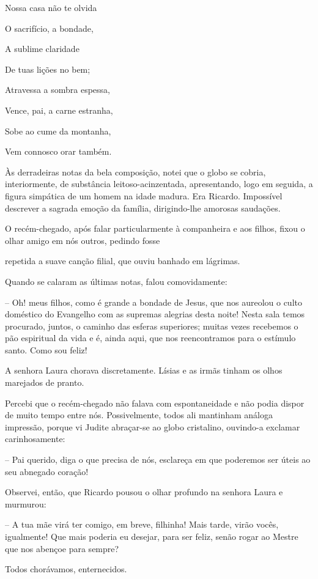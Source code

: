 \documentclass[portuguese,12pt,a4paper]{scrbook}
\begin{document}
	Nossa casa não te olvida
	
	O sacrifício, a bondade,
	
	A sublime claridade
	
	De tuas lições no bem;
	
	Atravessa a sombra espessa,
	
	Vence, pai, a carne estranha,
	
	Sobe ao cume da montanha,
	
	Vem connosco orar também.
	
	Às derradeiras notas da bela composição, notei que o globo se cobria, interiormente, de substância leitoso-acinzentada, apresentando, logo em seguida, a figura simpática de um homem na idade madura. Era Ricardo. Impossível descrever a sagrada emoção da família, dirigindo-lhe amorosas saudações.
	
	O recém-chegado, após falar particularmente à companheira e aos filhos, fixou o olhar amigo em nós outros, pedindo fosse
	
	
	repetida a suave canção filial, que ouviu banhado em lágrimas.
	
	Quando se calaram as últimas notas, falou comovidamente:
	
	– Oh! meus filhos, como é grande a bondade de Jesus, que nos aureolou o culto doméstico do Evangelho com as supremas alegrias desta noite! Nesta sala temos procurado, juntos, o caminho das esferas superiores; muitas vezes recebemos o pão espiritual da vida e é, ainda aqui, que nos reencontramos para o estímulo santo. Como sou feliz!
	
	A senhora Laura chorava discretamente. Lísias e as irmãs tinham os olhos marejados de pranto.
	
	Percebi que o recém-chegado não falava com espontaneidade e não podia dispor de muito tempo entre nós. Possivelmente, todos ali mantinham análoga impressão, porque vi Judite abraçar-se ao globo cristalino, ouvindo-a exclamar carinhosamente:
	
	– Pai querido, diga o que precisa de nós, esclareça em que poderemos ser úteis ao seu abnegado coração!
	
	Observei, então, que Ricardo pousou o olhar profundo na senhora Laura e murmurou:
	
	– A tua mãe virá ter comigo, em breve, filhinha! Mais tarde, virão vocês, igualmente! Que mais poderia eu desejar, para ser feliz, senão rogar ao Mestre que nos abençoe para sempre?
	
	Todos chorávamos, enternecidos.
	
\end{document}
